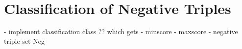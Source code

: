 \section{Classification of Negative Triples}
\label{sec:classification}




- implement classification class ?? which gets
    - minscore
    - maxscore
    - negative triple set Neg